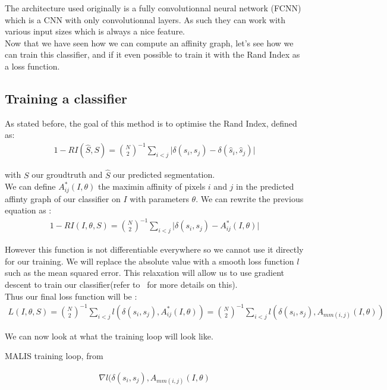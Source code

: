 The architecture used originally is a fully convolutionnal neural network
(FCNN) which is a CNN with only convolutionnal layers. As such they can work
with various input sizes which is always a nice feature.\\

Now that we have seen how we can compute an affinity graph, let's see how we
can train this classifier, and if it even possible to train it with the Rand
Index as a loss function.

\subsection{Training a classifier}

As stated before, the goal of this method is to optimise the Rand Index,
defined as:
\begin{gather*}
	1 - RI(\hat{S},S) = \binom{N}{2}^{-1} \sum_{i<j} \lvert \delta(s_i,s_j) -
	\delta(\hat{s}_i,\hat{s}_j) \rvert
\end{gather*}

with $S$ our groudtruth and $\hat{S}$ our predicted segmentation.\\
We can define $A^*_{ij}(I,\theta)$ the maximin affinity of pixels $i$ and $j$
in the predicted affinty graph of our classifier on $I$ with parameters
$\theta$. We can rewrite the previous equation as :
\begin{gather*}
	1 - RI(I,\theta,S) = \binom{N}{2}^{-1} \sum_{i<j} \lvert \delta(s_i,s_j) -
	 A^*_{ij}(I,\theta)\rvert
\end{gather*}

However this function is not differentiable everywhere so we cannot use it
directly for our training. We will replace the absolute value with a smooth
loss function $l$ such as the mean squared error. This relaxation will allow us
to use gradient descent to train our classifier(refer to~\cite{turaga_maximin_2009}
for more details on this).\\

Thus our final loss function will be :
\begin{gather*}
	L(I,\theta,S) = \binom{N}{2}^{-1} \sum_{i<j} l(\delta(s_i,s_j),
	A^*_{ij}(I,\theta))
	= \binom{N}{2}^{-1} \sum_{i<j} l(\delta(s_i,s_j),A_{mm(i,j)}(I,\theta))
\end{gather*}

We can now look at what the training loop will look like.

\begin{algorithm}
\begin{algorithmic}[1]
\caption{MALIS training loop, from~\cite{turaga_maximin_2009}}\label{alg:malis}
	\Repeat
		\begin{gather*}
			\nabla l(\delta(s_i,s_j),A_{mm(i,j)}(I,\theta)
		\end{gather*}
\end{algorithmic}
\end{algorithm}

